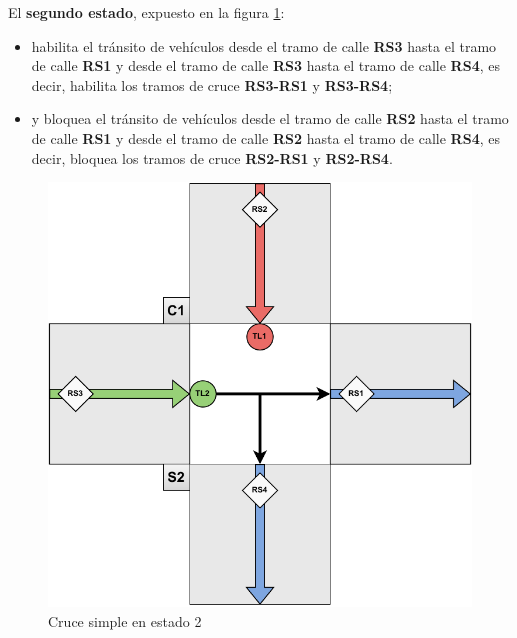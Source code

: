 El \textbf{segundo estado}, expuesto en la figura \ref{fig:cruce_simple_estado_2}:
\begin{itemize}
    \item habilita el tránsito de vehículos desde el tramo de calle \textbf{RS3} hasta el tramo de calle \textbf{RS1} y desde el tramo de calle \textbf{RS3} hasta el tramo de calle \textbf{RS4}, es decir, habilita los tramos de cruce \textbf{RS3-RS1} y \textbf{RS3-RS4};
    \item y bloquea el tránsito de vehículos desde el tramo de calle \textbf{RS2} hasta el tramo de calle \textbf{RS1} y desde el tramo de calle \textbf{RS2} hasta el tramo de calle \textbf{RS4}, es decir, bloquea los tramos de cruce \textbf{RS2-RS1} y \textbf{RS2-RS4}.
\end{itemize}
\begin{figure}[H]
    \centering
    \includegraphics[width=1\linewidth]{text/image/DCruc-CS-Estado2.pdf}
    \caption{Cruce simple en estado 2}
    \label{fig:cruce_simple_estado_2}
\end{figure}

\newpage
